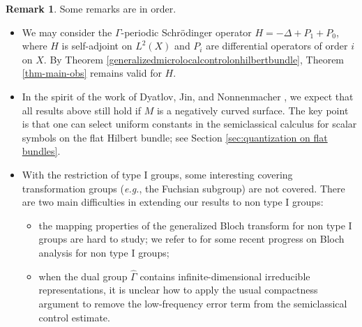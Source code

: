 \documentclass[11pt,oneside,reqno]{amsart}
\newtheorem{theorem}{Theorem}[section]
\theoremstyle{definition}
\newtheorem{remark}[definition]{Remark}
\numberwithin{equation}{section}
\theoremstyle{plain}
\begin{document}


\begin{remark}
Some remarks are in order.
\begin{itemize}
\item[(a)] We may consider the $\Gamma$-periodic Schrödinger operator $H=-\Delta+P_1+P_0$, where $H$ is self-adjoint on $L^2(X)$ and $P_i$ are differential operators of order $i$ on $X$. By Theorem \ref{generalizedmicrolocalcontrolonhilbertbundle}, Theorem \ref{thm-main-obs} remains valid for $H$.
\item[(b)] In the spirit of the work of Dyatlov, Jin, and Nonnenmacher \cite{dyatlov2022control}, we expect that all results above still hold if $M$ is a negatively curved surface. The key point is that one can select uniform constants in the semiclassical calculus for scalar symbols on the flat Hilbert bundle; see Section \ref{sec:quantization on flat bundles}.
\item[(c)] With the restriction of type I groups, some interesting covering transformation groups (\emph{e.g.}, the Fuchsian subgroup) are not covered. There are two main difficulties in extending our results to non type I groups: 
\begin{itemize}
    \item the mapping properties of the generalized Bloch transform for non type I groups are hard to study; we refer to \cite{nagy2024hyperbolic, katsuda2025extension} for some recent progress on Bloch analysis for non type I groups;
    \item when the dual group $\widehat{\Gamma}$ contains infinite-dimensional irreducible representations, it is unclear how to apply the usual compactness argument to remove the low-frequency error term from the semiclassical control estimate.
\end{itemize}
\end{itemize}
\end{remark}
\end{document}

